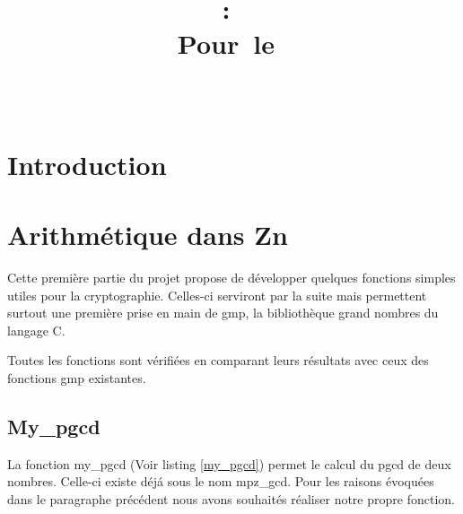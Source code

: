 \documentclass{article}
\title{
\vspace{2in}
\textmd{\textbf{\hmwkClass:\ \hmwkTitle}}\\
\normalsize\vspace{0.1in}\small{Pour\ le\ \hmwkDueDate}\\
\vspace{0.1in}\large{\textit{\hmwkClassInstructor\ \hmwkClassTime}}
\vspace{3in}
}
\author{\textbf{\hmwkAuthorName}}
\date{} %
\begin{document}
\maketitle



\newpage
\tableofcontents
\newpage

\newpage
\section{Introduction}


\newpage

\section{Arithm\'etique dans Zn}

Cette premi\`ere partie du projet propose de d\'evelopper quelques fonctions simples utiles pour la cryptographie. Celles-ci serviront par la suite mais permettent surtout une premi\`ere prise en main de gmp, la biblioth\`eque grand nombres du langage C.

Toutes les fonctions sont vérifiées en comparant leurs résultats avec ceux des fonctions gmp existantes.

\subsection{My\_pgcd}

La fonction my\_pgcd (Voir listing \ref{my_pgcd}) permet le calcul du pgcd de deux nombres.
Celle-ci existe d\'ej\'a sous le nom mpz\_gcd. Pour les raisons \'evoqu\'ees dans le paragraphe pr\'ec\'edent nous avons souhait\'es r\'ealiser notre propre fonction.
\end{document}
